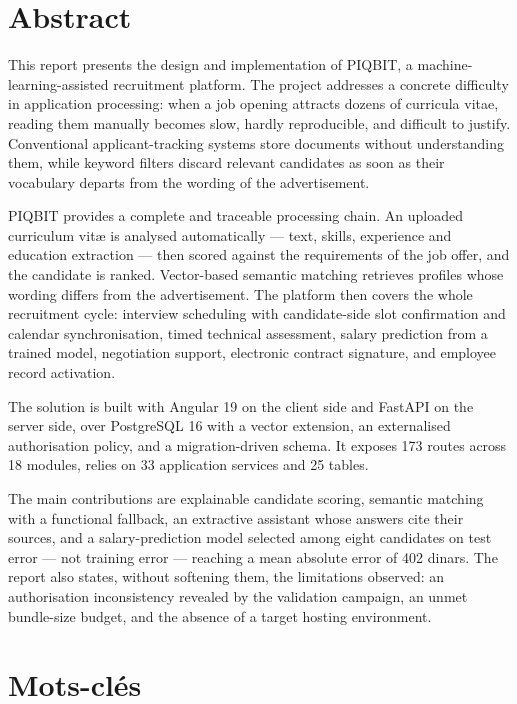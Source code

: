 \chapter*{Abstract}

This report presents the design and implementation of PIQBIT, a
machine-learning-assisted recruitment platform. The project addresses a
concrete difficulty in application processing: when a job opening attracts
dozens of curricula vitae, reading them manually becomes slow, hardly
reproducible, and difficult to justify. Conventional applicant-tracking systems
store documents without understanding them, while keyword filters discard
relevant candidates as soon as their vocabulary departs from the wording of the
advertisement.

PIQBIT provides a complete and traceable processing chain. An uploaded
curriculum vitæ is analysed automatically — text, skills, experience and
education extraction — then scored against the requirements of the job offer,
and the candidate is ranked. Vector-based semantic matching retrieves profiles
whose wording differs from the advertisement. The platform then covers the
whole recruitment cycle: interview scheduling with candidate-side slot
confirmation and calendar synchronisation, timed technical assessment, salary
prediction from a trained model, negotiation support, electronic contract
signature, and employee record activation.

The solution is built with Angular 19 on the client side and FastAPI on the
server side, over PostgreSQL 16 with a vector extension, an externalised
authorisation policy, and a migration-driven schema. It exposes 173 routes
across 18 modules, relies on 33 application services and 25 tables.

The main contributions are explainable candidate scoring, semantic matching
with a functional fallback, an extractive assistant whose answers cite their
sources, and a salary-prediction model selected among eight candidates on test
error — not training error — reaching a mean absolute error of 402 dinars. The
report also states, without softening them, the limitations observed: an
authorisation inconsistency revealed by the validation campaign, an unmet
bundle-size budget, and the absence of a target hosting environment.

\chapter*{Mots-clés}

